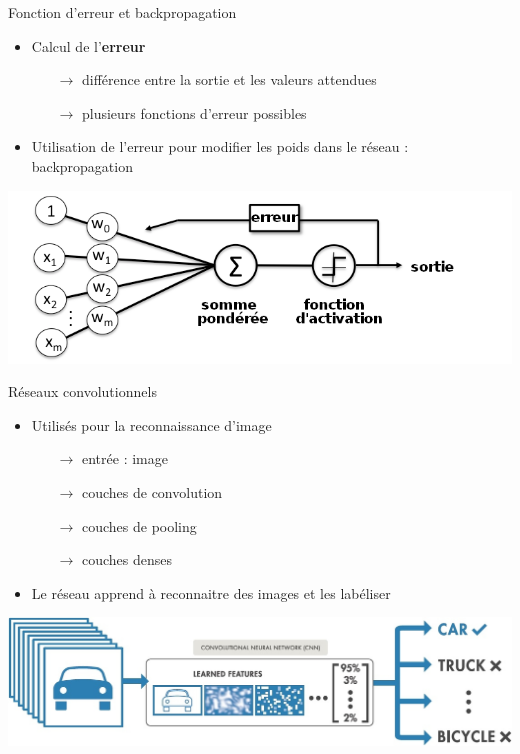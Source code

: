 \documentclass[compress]{beamer}
\begin{document}
\begin{frame}{Fonction d'erreur et backpropagation}
	\begin{itemize}
		\item Calcul de l'\textbf{\color{fibeamer@orange}erreur} 
		\begin{itemize}
		  \item[$\rightarrow$] différence entre la sortie et les valeurs attendues
		  \item[$\rightarrow$] plusieurs fonctions d'erreur possibles
		\end{itemize}
		\item Utilisation de l'erreur pour modifier les poids dans le réseau : backpropagation
	\end{itemize}	
	\centering
	\includegraphics[width=1\linewidth]{resources/clem/error}
\end{frame}

\begin{frame}{Réseaux convolutionnels}
	\begin{itemize}
		\item Utilisés pour la reconnaissance d'image
		\begin{itemize}
			\item[$\rightarrow$] entrée : image
			\item[$\rightarrow$] couches de convolution
			\item[$\rightarrow$] couches de pooling
			\item[$\rightarrow$] couches denses
		\end{itemize}
		\item Le réseau apprend à reconnaitre des images et les labéliser
	\end{itemize}	
	\centering
	\includegraphics[width=1\linewidth]{resources/clem/car2}
\end{frame}
\end{document}
